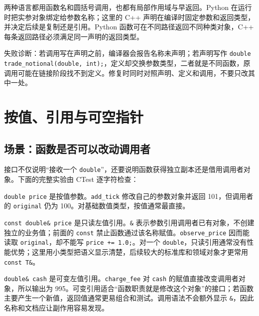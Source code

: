 \begin{pythonbridge}
两种语言都用函数名和圆括号调用，也都有局部作用域与早返回。Python 在运行时把实参对象绑定给参数名称；这里的 C++ 声明在编译时固定参数和返回类型，并决定后续是复制还是引用。Python 函数可在不同路径返回不同种类对象，C++ 每条返回路径必须满足同一声明的返回类型。

\end{pythonbridge}

失败诊断：若调用写在声明之前，编译器会报告名称未声明；若声明写作 \texttt{double trade\_notional(double, int);}，定义却交换参数类型，二者就是不同函数，原调用可能在链接阶段找不到定义。修复时同时对照声明、定义和调用，不要只改其中一处。

\section{按值、引用与可空指针}

\subsection{场景：函数是否可以改动调用者}

接口不仅说明“接收一个 \texttt{double}”，还要说明函数获得独立副本还是借用调用者对象。下面的完整实验由 CTest 逐字符检查：



\texttt{double price} 是按值参数。\texttt{add\_tick} 修改自己的参数对象并返回 101，但调用者的 \texttt{original} 仍为 100。对基础数值类型，按值通常最直接。

\texttt{const double\& price} 是只读左值引用。\texttt{\&} 表示参数引用调用者已有对象，不创建独立的业务值；前面的 \texttt{const} 禁止函数通过该名称赋值。\texttt{observe\_price} 因而能读取 \texttt{original}，却不能写 \texttt{price += 1.0;}。对一个 \texttt{double}，只读引用通常没有性能优势；这里用小类型把语义显示清楚，后续较大的标准库和领域对象才更常用 \texttt{const T\&}。

\texttt{double\& cash} 是可变左值引用。\texttt{charge\_fee} 对 \texttt{cash} 的赋值直接改变调用者对象，所以输出为 995。可变引用适合“函数职责就是修改这个对象”的接口；若函数主要产生一个新值，返回值通常更易组合和测试。调用语法不会额外显示 \texttt{\&}，因此名称和文档应让副作用容易发现。

